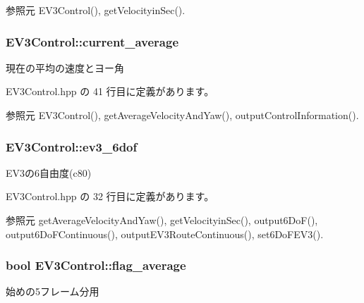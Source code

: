 参照元 E\-V3\-Control(), get\-Velocityin\-Sec().

\subsubsection[{current\-\_\-average}]{ E\-V3\-Control\-::current\-\_\-average}\label{class_e_v3_control_a506596061888dfd4afc965d20fed26a8}


現在の平均の速度とヨー角 



 E\-V3\-Control.\-hpp の 41 行目に定義があります。



参照元 E\-V3\-Control(), get\-Average\-Velocity\-And\-Yaw(), output\-Control\-Information().

\subsubsection[{ev3\-\_\-6dof}]{ E\-V3\-Control\-::ev3\-\_\-6dof}\label{class_e_v3_control_adeff38f95194c020c3c1c5c3ef6bd994}


E\-V3の6自由度(c80) 



 E\-V3\-Control.\-hpp の 32 行目に定義があります。



参照元 get\-Average\-Velocity\-And\-Yaw(), get\-Velocityin\-Sec(), output6\-Do\-F(), output6\-Do\-F\-Continuous(), output\-E\-V3\-Route\-Continuous(), set6\-Do\-F\-E\-V3().

\subsubsection[{flag\-\_\-average}]{\setlength{\rightskip}{0pt plus 5cm}bool E\-V3\-Control\-::flag\-\_\-average}\label{class_e_v3_control_a07e70076fc9fb9085b55be1a3a7be187}


始めの5フレーム分用 



